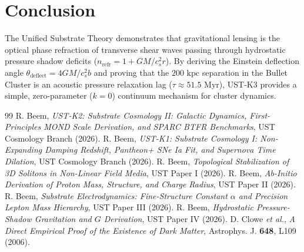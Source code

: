 \documentclass[11pt,a4paper]{article}
\begin{document}
	\section{Conclusion}
	\label{sec:conclusion}
	
	The Unified Substrate Theory demonstrates that gravitational lensing is the optical phase refraction of transverse shear waves passing through hydrostatic pressure shadow deficits ($n_{\text{refr}} = 1 + GM/c_s^2 r$). By deriving the Einstein deflection angle $\theta_{\text{deflect}} = 4GM/c_s^2 b$ and proving that the $200 \text{ kpc}$ separation in the Bullet Cluster is an acoustic pressure relaxation lag ($\tau \approx 51.5 \text{ Myr}$), UST-K3 provides a simple, zero-parameter ($k=0$) continuum mechanism for cluster dynamics.
	
	\begin{thebibliography}{99}
		 R. Beem, \textit{UST-K2: Substrate Cosmology II: Galactic Dynamics, First-Principles MOND Scale Derivation, and SPARC BTFR Benchmarks}, UST Cosmology Branch (2026).
		 R. Beem, \textit{UST-K1: Substrate Cosmology I: Non-Expanding Damping Redshift, Pantheon+ SNe Ia Fit, and Supernova Time Dilation}, UST Cosmology Branch (2026).
		 R. Beem, \textit{Topological Stabilization of 3D Solitons in Non-Linear Field Media}, UST Paper I (2026).
		 R. Beem, \textit{Ab-Initio Derivation of Proton Mass, Structure, and Charge Radius}, UST Paper II (2026).
		 R. Beem, \textit{Substrate Electrodynamics: Fine-Structure Constant $\alpha$ and Precision Lepton Mass Hierarchy}, UST Paper III (2026).
		 R. Beem, \textit{Hydrostatic Pressure-Shadow Gravitation and $G$ Derivation}, UST Paper IV (2026).
		 D. Clowe \textit{et al.}, \textit{A Direct Empirical Proof of the Existence of Dark Matter}, Astrophys. J. \textbf{648}, L109 (2006).
	\end{thebibliography}
	
\end{document}
